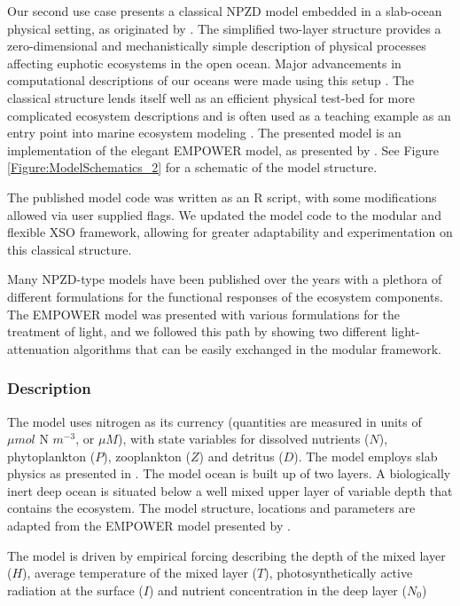 \documentclass[journal abbreviation, manuscript]{copernicus}
\begin{document}
Our second use case presents a classical NPZD model embedded in a slab-ocean physical setting, as originated by \citet{Steele1962EnvironmentalSea}. The simplified two-layer structure provides a zero-dimensional and mechanistically simple description of physical processes affecting euphotic ecosystems in the open ocean. Major advancements in computational descriptions of our oceans were made using this setup \citep[e.g.,][]{Evans1985ACycles, Fasham1990a}. The classical structure lends itself well as an efficient physical test-bed for more complicated ecosystem descriptions and is often used as a teaching example as an entry point into marine ecosystem modeling \citep{Anderson2015c}.
The presented model is an implementation of the elegant EMPOWER model, as presented by \citet{Anderson2015c}. See Figure \ref{Figure:ModelSchematics_2} for a schematic of the model structure.

The published model code was written as an R script, with some modifications allowed via user supplied flags. We updated the model code to the modular and flexible XSO framework, allowing for greater adaptability and experimentation on this classical structure.

Many NPZD-type models have been published over the years with a plethora of different formulations for the functional responses of the ecosystem components. The EMPOWER model was presented with various formulations for the treatment of light, and we followed this path by showing two different light-attenuation algorithms that can be easily exchanged in the modular framework. 

\subsubsection{Description}
The model uses nitrogen as its currency (quantities are measured in units of $\mu mol$ N $m^{-3}$, or $\mu M$), with state variables for dissolved nutrients ($N$), phytoplankton ($P$), zooplankton ($Z$) and detritus ($D$). The model employs slab physics as presented in \citet{Evans1985ACycles}. The model ocean is built up of two layers. A biologically inert deep ocean is situated below a well mixed upper layer of variable depth that contains the ecosystem. The model structure, locations and parameters are adapted from the EMPOWER model presented by \citet{Anderson2015c}.

The model is driven by empirical forcing describing the depth of the mixed layer ($H$), average temperature of the mixed layer ($T$), photosynthetically active radiation at the surface ($I$) and nutrient concentration in the deep layer ($N_0$) 
\end{document}
